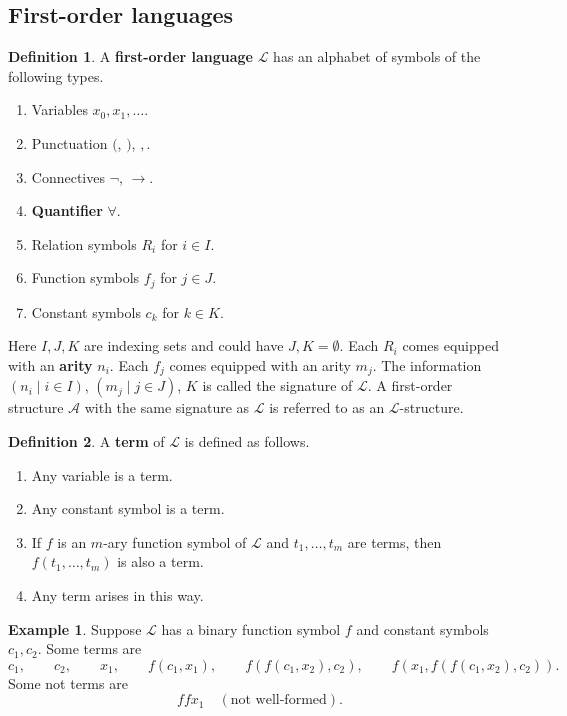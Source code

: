 \documentclass{article}
\newcommand{\rb}[1]{\left( #1 \right)}
\theoremstyle{definition}\newtheorem{definition}{Definition}[subsection]
\theoremstyle{definition}\newtheorem{remark}[definition]{Remark}
\theoremstyle{definition}\newtheorem*{example}{Example}
\theoremstyle{definition}\newtheorem*{note}{Note}
\begin{document}
\subsection{First-order languages}

\begin{definition}
\label{def:2.2.1}
A \textbf{first-order language} $ \mathcal{L} $ has an alphabet of symbols of the following types.
\begin{enumerate}
\item Variables $ x_0, x_1, \dots $.
\item Punctuation $ ( $, $ ) $, $ , $.
\item Connectives $ \neg $, $ \rightarrow $.
\item \textbf{Quantifier} $ \forall $.
\item Relation symbols $ R_i $ for $ i \in I $.
\item Function symbols $ f_j $ for $ j \in J $.
\item Constant symbols $ c_k $ for $ k \in K $.
\end{enumerate}
Here $ I, J, K $ are indexing sets and could have $ J, K = \emptyset $. Each $ R_i $ comes equipped with an \textbf{arity} $ n_i $. Each $ f_j $ comes equipped with an arity $ m_j $. The information $ \rb{n_i \mid i \in I} $, $ \rb{m_j \mid j \in J} $, $ K $ is called the signature of $ \mathcal{L} $. A first-order structure $ \mathcal{A} $ with the same signature as $ \mathcal{L} $ is referred to as an $ \mathcal{L} $-structure.
\end{definition}

\begin{definition}
A \textbf{term} of $ \mathcal{L} $ is defined as follows.
\begin{enumerate}
\item Any variable is a term.
\item Any constant symbol is a term.
\item If $ f $ is an $ m $-ary function symbol of $ \mathcal{L} $ and $ t_1, \dots, t_m $ are terms, then $ f\rb{t_1, \dots, t_m} $ is also a term.
\item Any term arises in this way.
\end{enumerate}
\end{definition}

\begin{example}
Suppose $ \mathcal{L} $ has a binary function symbol $ f $ and constant symbols $ c_1, c_2 $. Some terms are
$$ c_1, \qquad c_2, \qquad x_1, \qquad f\rb{c_1, x_1}, \qquad f\rb{f\rb{c_1, x_2}, c_2}, \qquad f\rb{x_1, f\rb{f\rb{c_1, x_2}, c_2}}. $$
Some not terms are
$$ ffx_1 \quad \rb{\text{not well-formed}}. $$
\end{example}
\end{document}
